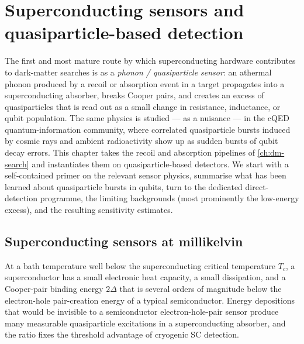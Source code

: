 \chapter{Superconducting sensors and quasiparticle-based detection}
\label{ch:qp-detection}

The first and most mature route by which superconducting hardware
contributes to dark-matter searches is as a \emph{phonon /
quasiparticle sensor}: an athermal phonon produced by a recoil or
absorption event in a target propagates into a superconducting
absorber, breaks Cooper pairs, and creates an excess of
quasiparticles that is read out as a small change in resistance,
inductance, or qubit population. The same physics is studied --- as
a nuisance --- in the cQED quantum-information community, where
correlated quasiparticle bursts induced by cosmic rays and ambient
radioactivity show up as sudden bursts of qubit decay errors. This
chapter takes the recoil and absorption pipelines of
\cref{ch:dm-search} and instantiates them on quasiparticle-based
detectors. We start with a self-contained primer on the relevant
sensor physics, summarise what has been learned about
quasiparticle bursts in qubits, turn to the dedicated
direct-detection programme, the limiting backgrounds (most
prominently the low-energy excess), and the resulting sensitivity
estimates.

\section{Superconducting sensors at millikelvin}
\label{sec:sc-sensors}

\begin{phenomenon}
At a bath temperature well below the superconducting critical
temperature $T_c$, a superconductor has a small electronic heat
capacity, a small dissipation, and a Cooper-pair binding energy
$2\Delta$ that is several orders of magnitude below the
electron-hole pair-creation energy of a typical semiconductor.
Energy depositions that would be invisible to a semiconductor
electron-hole-pair sensor produce many measurable
quasiparticle excitations in a superconducting absorber, and the
ratio fixes the threshold advantage of cryogenic SC detection.
\end{phenomenon}

